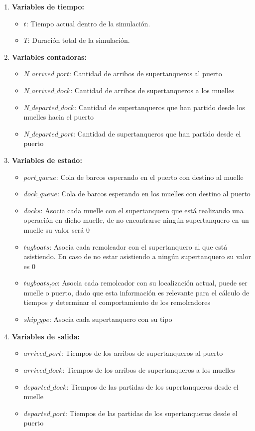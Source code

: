 \documentclass[titlepage,11pt]{scrartcl}
\begin{document}
	\begin{enumerate}
		\item \textbf{Variables de tiempo:}
			\begin{itemize}
				\item $t$: Tiempo actual dentro de la simulaci\'on.
				\item $T$: Duraci\'on total de la simulaci\'on.
			\end{itemize}
		\item \textbf{Variables contadoras:}
			\begin{itemize}
				\item $N\_arrived\_port$: Cantidad de arribos de supertanqueros al puerto
				\item $N\_arrived\_dock$: Cantidad de arribos de supertanqueros a los muelles
				\item $N\_departed\_dock$: Cantidad de supertanqueros que han partido desde los muelles hacia el puerto
				\item $N\_departed\_port$: Cantidad de supertanqueros que han partido desde el puerto
			\end{itemize}
		\item \textbf{Variables de estado:}
			\begin{itemize}
				\item $port\_queue$: Cola de barcos esperando en el puerto con destino al muelle
				\item $dock\_queue$: Cola de barcos esperando en los muelles con destino al puerto
				\item $docks$: Asocia cada muelle con el supertanquero que est\'a realizando una operaci\'on en dicho muelle, de no encontrarse ning\'un supertanquero en un muelle su valor ser\'a 0
				\item $tugboats$: Asocia cada remolcador con el supertanquero al que est\'a asistiendo. En caso de no estar asistiendo a ning\'un supertanquero su valor es 0
				\item $tugboats_loc$: Asocia cada remolcador con su localizaci\'on actual, puede ser muelle o puerto, dado que esta informaci\'on es relevante para el c\'alculo de tiempos y determinar el comportamiento de los remolcadores
				\item $ship_type$: Asocia cada supertanquero con su tipo
            \end{itemize}
		\item \textbf{Variables de salida:}
			\begin{itemize}
                \item $arrived\_port$: Tiempos de los arribos de supertanqueros al puerto
				\item $arrived\_dock$: Tiempos de los arribos de supertanqueros a los muelles
				\item $departed\_dock$: Tiempos de las partidas de los supertanqueros desde el muelle
				\item $departed\_port$: Tiempos de las partidas de los supertanqueros desde el puerto
			\end{itemize}


\end{enumerate}
\end{document}

